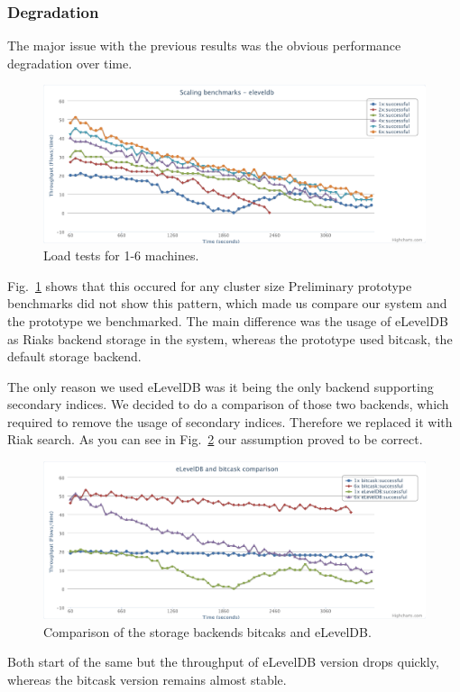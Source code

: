 \documentclass[11pt,a4paper]{report}
\begin{document}
\subsubsection{Degradation}
The major issue with the previous results was the obvious performance degradation over time.
\begin{figure}[htbp!]
 \hspace{-2.5cm}
 \includegraphics[width=18cm]{./graphics/Load_test-degradation.pdf}
 \caption{Load tests for 1-6 machines.}
 \label{fig:load_test:degradation}
\end{figure}
Fig.~\ref{fig:load_test:degradation} shows that this occured for any cluster size
Preliminary prototype benchmarks did not show this pattern,
which made us compare our system and the prototype we benchmarked.
The main difference was the usage of eLevelDB as Riaks backend storage in the system,
whereas the prototype used bitcask, the default storage backend.

The only reason we used eLevelDB was it being the only backend supporting secondary indices.
We decided to do a comparison of those two backends,
which required to remove the usage of secondary indices.
Therefore we replaced it with Riak search.
As you can see in Fig.~\ref{fig:load_test:degradation_compare} our assumption proved to be correct.
\begin{figure}[htbp!]
 \hspace{-2.5cm}
 \includegraphics[width=18cm]{./graphics/Load_test-degradation_compare.pdf}
 \caption{Comparison of the storage backends bitcaks and eLevelDB.}
 \label{fig:load_test:degradation_compare}
\end{figure}
Both start of the same but the throughput of eLevelDB version drops quickly,
whereas the bitcask version remains almost stable.
\end{document}
